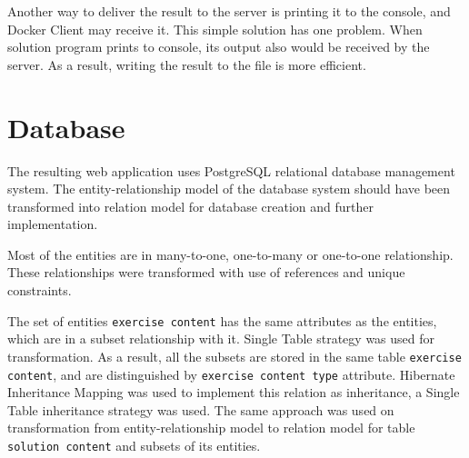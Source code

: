         Another way to deliver the result to the server is printing it to the console, and Docker Client may receive it. This simple solution has one problem. When solution program prints to console, its output also would be received by the server. As a result, writing the result to the file is more efficient.
    
    
    \section{Database}
    The resulting web application uses PostgreSQL relational database management system. The entity-relationship model of the database system should have been transformed into relation model for database creation and further implementation.
    
    Most of the entities are in many-to-one, one-to-many or one-to-one relationship. These relationships were transformed with use of references and unique constraints.
    
    The set of entities \texttt{exercise content} has the same attributes as the entities, which are in a subset relationship with it. Single Table strategy was used for transformation. As a result, all the subsets are stored in the same table \texttt{exercise content}, and are distinguished by \texttt{exercise content type} attribute. Hibernate Inheritance Mapping was used to implement this relation as inheritance, a Single Table inheritance strategy was used. The same approach was used on transformation from entity-relationship model to relation model for table \texttt{solution content} and subsets of its entities.
    
    
    
    
    

